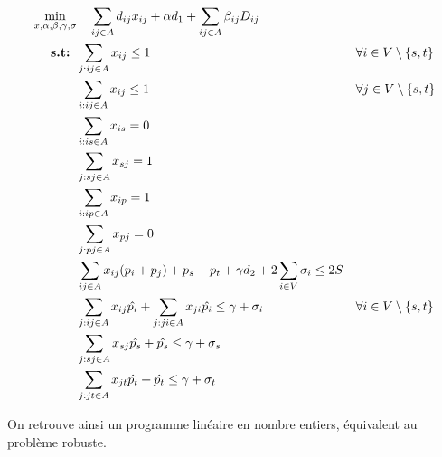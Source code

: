 \documentclass{article}
\begin{document}
\begin{align}
  \min_{x, \alpha, \beta, \gamma, \sigma} & \ \ \ \sum_{ij \in A} d_{ij} x_{ij} + \alpha d_1 + \sum_{ij \in A} \beta_{ij} D_{ij} && \notag \\
  \textbf{s.t: }  &\sum_{j: ij \in A} x_{ij} \leq 1 && \forall i \in V \setminus{\{s,t\}} \notag \\
  &\sum_{i: ij \in A} x_{ij} \leq 1 && \forall j \in V \setminus{\{s,t\}} \notag\\
  &\sum_{i: is \in A} x_{is} = 0 \notag \\
  &\sum_{j: sj \in A} x_{sj} = 1 \notag \\
  &\sum_{i: ip \in A} x_{ip} = 1 \notag \\
  &\sum_{j: pj \in A} x_{pj} = 0 \notag \\
  &\sum_{ij \in A} x_{ij} (p_i + p_j) + p_s + p_t + \gamma d_2 + 2 \sum_{i \in V} \sigma_i \leq 2S \notag \\
  & \sum_{j: ij \in A} x_{ij} \hat{p_i} + \sum_{j: ji \in A} x_{ji} \hat{p_i} \leq \gamma + \sigma_i && \forall i \in V \setminus{\{s,t\}} \\
  & \sum_{j: sj \in A} x_{sj} \hat{p_s} + \hat{p_s} \leq \gamma + \sigma_s \\
  & \sum_{j: jt \in A} x_{jt} \hat{p_t} + \hat{p_t} \leq \gamma + \sigma_t
\end{align}

On retrouve ainsi un programme linéaire en nombre entiers, équivalent au problème robuste.







\end{document}
